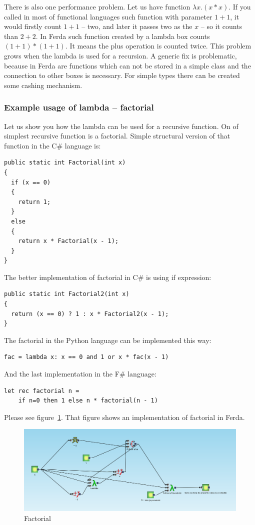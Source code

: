 \documentclass[a4paper,12pt]{book}
\begin{document}
There is also one performance problem. Let us have function $\lambda x.(x*x)$. If you called in most of functional languages such function with parameter $1+1$, it would firstly count $1+1$ -- two, and later it passes two as the $x$ -- so it counts than $2+2$. In Ferda such function created by a lambda box counts $(1+1)*(1+1)$. It means the plus operation is counted twice. This problem grows when the lambda is used for a recursion. A generic fix is problematic, because in Ferda are functions which can not be stored in a simple class and the connection to other boxes is necessary. For simple types there can be created some cashing mechanism.

\subsubsection{Example usage of lambda -- factorial}
Let us show you how the lambda can be used for a recursive function. On of simplest recursive function is a factorial. Simple structural version of that function in the C\# language is: 
\begin{verbatim}
public static int Factorial(int x)
{
  if (x == 0)
  {
    return 1;
  }
  else
  {
    return x * Factorial(x - 1);
  }
}
\end{verbatim}
	
The better implementation of factorial in C\# is using if expression:
\begin{verbatim}
public static int Factorial2(int x)
{
  return (x == 0) ? 1 : x * Factorial2(x - 1);
}
\end{verbatim}

The factorial in the Python language can be implemented this way:
\begin{verbatim}
fac = lambda x: x == 0 and 1 or x * fac(x - 1)
\end{verbatim}

And the last implementation in the F\# language:
\begin{verbatim}
let rec factorial n =
    if n=0 then 1 else n * factorial(n - 1)
\end{verbatim}

Please see figure~\ref{fig:factorial}. That figure shows an implementation of factorial in Ferda.
\begin{figure}
	\includegraphics[width=1\textwidth]{faktorial}
	\caption{Factorial}
	\label{fig:factorial}
\end{figure}
\end{document}
